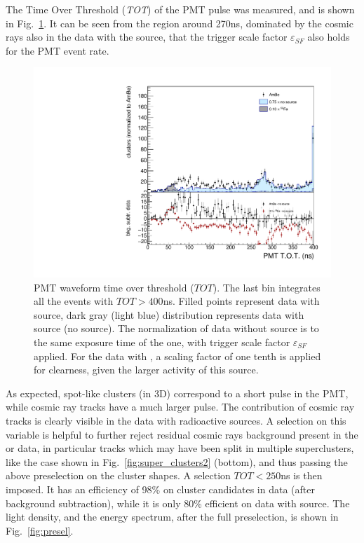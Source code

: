 %
The Time Over Threshold (\textit{TOT}) of the PMT pulse was measured,
and is shown in Fig.~\ref{fig:pmttot}. It can be seen from the region
around 270\unit{ns}, dominated by the cosmic rays also in the data
with the \ambe source, that the trigger scale factor
$\varepsilon_{SF}$ also holds for the PMT event rate.
%
\begin{figure}[ht]
  \begin{center}
  \includegraphics[width=0.45\linewidth]{figures/pmt_tot}

   \caption{PMT waveform time over threshold ($TOT$).  The last bin
    integrates all the events with $TOT>400$\unit{ns}. Filled points
    represent data with \ambe source, dark gray (light blue)
    distribution represents data with \fe source (no source).  The
    normalization of data without source is to the same exposure time
    of the \ambe one, with trigger scale factor $\varepsilon_{SF}$
    applied. For the data with \fe, a scaling factor of one tenth is
    applied for clearness, given the larger activity of this
    source. \label{fig:pmttot}}

  \end{center}
\end{figure}
%
As expected, spot-like clusters (in 3D) correspond to a short pulse in
the PMT, while cosmic ray tracks have a much larger pulse. The
contribution of cosmic ray tracks is clearly visible in the data with
radioactive sources. A selection on this variable is helpful to
further reject residual cosmic rays background present in the \ambe or
\fe data, in particular tracks which may have been split in multiple
superclusters, like the case shown in Fig.~\ref{fig:super_clusters2}
(bottom), and thus passing the above preselection on the cluster
shapes. A selection $TOT<250$\unit{ns} is then imposed.  It has an efficiency of 98\% on cluster candidates in
\ambe data (after background subtraction), while it is only 80\%
efficient on data with \fe source.  The light density, and the energy
spectrum, after the full preselection, is shown in
Fig.~\ref{fig:presel}.
%
